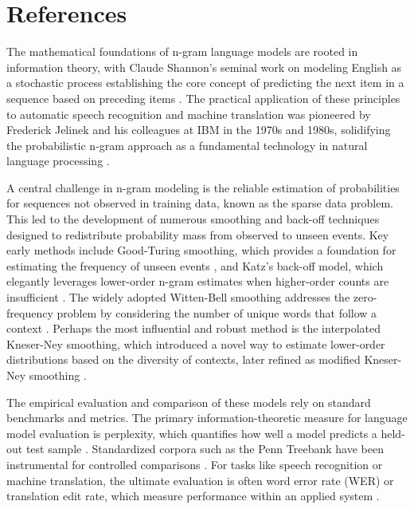 \documentclass[10pt,a4paper]{article}
\begin{document}
\section{ References }
The mathematical foundations of n-gram language models are rooted in information theory, with Claude Shannon's seminal work on modeling English as a stochastic process establishing the core concept of predicting the next item in a sequence based on preceding items \cite{anonndshannon1948}. The practical application of these principles to automatic speech recognition and machine translation was pioneered by Frederick Jelinek and his colleagues at IBM in the 1970s and 1980s, solidifying the probabilistic n-gram approach as a fundamental technology in natural language processing \cite{anonndjelinek1976} \cite{anonndjelinek1980}.

A central challenge in n-gram modeling is the reliable estimation of probabilities for sequences not observed in training data, known as the sparse data problem. This led to the development of numerous smoothing and back-off techniques designed to redistribute probability mass from observed to unseen events. Key early methods include Good-Turing smoothing, which provides a foundation for estimating the frequency of unseen events \cite{anonndgood1953}, and Katz's back-off model, which elegantly leverages lower-order n-gram estimates when higher-order counts are insufficient \cite{anonndkatz1987}. The widely adopted Witten-Bell smoothing addresses the zero-frequency problem by considering the number of unique words that follow a context \cite{anonndwitten1991}. Perhaps the most influential and robust method is the interpolated Kneser-Ney smoothing, which introduced a novel way to estimate lower-order distributions based on the diversity of contexts, later refined as modified Kneser-Ney smoothing \cite{anonndkneser1995} \cite{anonndchen1999}.

The empirical evaluation and comparison of these models rely on standard benchmarks and metrics. The primary information-theoretic measure for language model evaluation is perplexity, which quantifies how well a model predicts a held-out test sample \cite{anonndjelinek1977}. Standardized corpora such as the Penn Treebank have been instrumental for controlled comparisons \cite{anonndmarcus1993}. For tasks like speech recognition or machine translation, the ultimate evaluation is often word error rate (WER) or translation edit rate, which measure performance within an applied system \cite{anonndjelinek1976}.
\end{document}
